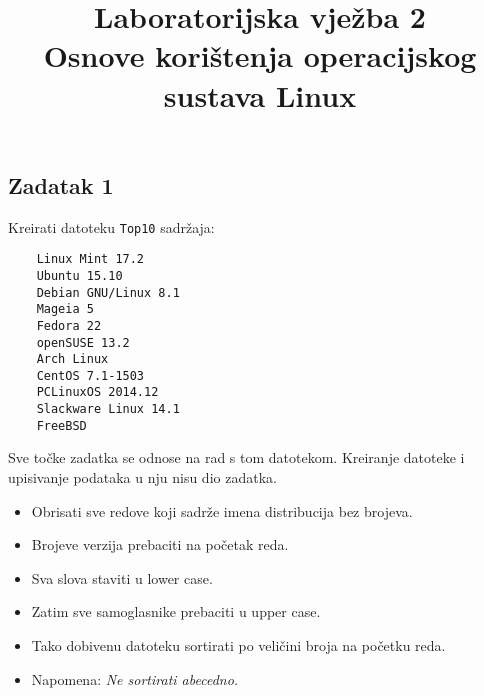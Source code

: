 \documentclass[12pt,a4paper]{article}
\newcommand{\shell}[1]{\texttt{#1}}
\begin{document}
	\title{Laboratorijska vježba 2\\{\small Osnove korištenja operacijskog sustava Linux}\vspace{-2em}}
	\maketitle
	\subsection*{Zadatak 1}
	Kreirati datoteku \shell{Top10} sadržaja:
	\begin{verbatim}
	Linux Mint 17.2
	Ubuntu 15.10
	Debian GNU/Linux 8.1
	Mageia 5
	Fedora 22
	openSUSE 13.2
	Arch Linux
	CentOS 7.1-1503
	PCLinuxOS 2014.12
	Slackware Linux 14.1
	FreeBSD
	\end{verbatim}
	Sve točke zadatka se odnose na rad s tom datotekom. Kreiranje datoteke i upisivanje podataka u nju nisu dio zadatka.
	\begin{itemize}
		\item Obrisati sve redove koji sadrže imena distribucija bez brojeva.
		\item Brojeve verzija prebaciti na početak reda.
		\item Sva slova staviti u lower case.
		\item Zatim sve samoglasnike prebaciti u upper case.
		\item Tako dobivenu datoteku sortirati po veličini broja na početku reda.
		\item[] Napomena: \textit{Ne sortirati abecedno.}
	\end{itemize}
\end{document}
